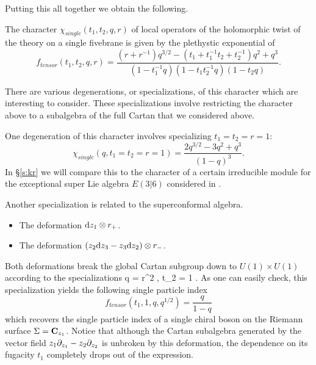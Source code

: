 Putting this all together we obtain the following.

\begin{prop}
The character $\chi_{single}(t_1,t_2,q,r)$ of local operators of the holomorphic twist of the theory on a single fivebrane is given by the plethystic exponential of
\[
f_{tensor} (t_1,t_2,q,r) = \frac{(r + r^{-1})q^{3/2} - (t_1 + t_1^{-1} t_2 + t_2^{-1} )q^2 + q^3}{(1-t_1^{-1}q) (1-t_1 t_2^{-1} q) (1-t_2 q)} .
\]
\end{prop}

\parsec

There are various degenerations, or specializations, of this character which are interesting to consider.
These specializations involve restricting the character above to a subalgebra of the full Cartan that we considered above.

One degeneration of this character involves specializing $t_1=t_2=r=1$:
\[
\chi_{single} (q,t_1=t_2=r=1) = \frac{2 q^{3/2} - 3 q^2 + q^3}{(1-q)^3} .
\]
In \S \ref{s:kr} we will compare this to the character of a certain irreducible module for the exceptional super Lie algebra $E(3|6)$ considered in \cite{KR2}.

\parsec

Another specialization is related to the superconformal algebra.

\begin{itemize}
\item The deformation ${\rm d} z_1 \otimes r_+$.
\item The deformation $(z_2 {\rm d} z_3 - z_3 {\rm d} z_2) \otimes r_-$. 
\end{itemize}

Both deformations break the global Cartan subgroup down to $U(1) \times U(1)$ according to the specializations
\beqn\label{eqn:special1}
q = r^2 , \quad t_2 = 1 .
\eeqn
As one can easily check, this specialization yields the following single particle index
\[
f_{tensor}(t_1, 1, q, q^{1/2}) = \frac{q}{1-q} 
\]
which recovers the single particle index of a single chiral boson on the Riemann surface $\Sigma = \mathbf{C}_{z_1}$. 
Notice that although the Cartan subalgebra generated by the vector field $z_1 \partial_{z_1} - z_2 \partial_{z_2}$ is unbroken by this deformation, the dependence on its fugacity $t_1$ completely drops out of the expression.

